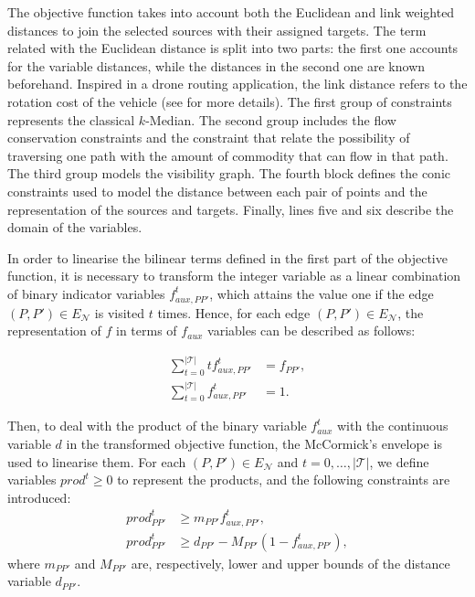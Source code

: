 \documentclass[a4paper,  review, authoryear, 1p.]{elsarticle}
\newcommand{\EN}{{E^{}_{\mathcal N}}}
\newcommand{\CV}[1]{{\color{blue}#1}}
\begin{document}
		\CV{
		The objective function takes into account both the Euclidean and link weighted distances to join the selected sources with their assigned targets. \CV{The term related with the Euclidean distance is split into two parts: the first one accounts for the variable distances, while the distances in the second one are known beforehand. Inspired in a drone routing application, the link distance refers to the rotation cost of the vehicle (see \cite{maheshwari2000} for more details)}. The first group of constraints represents the classical $k$-Median. The second group includes the flow conservation constraints and the constraint that relate the possibility of traversing one path with the amount of commodity that can flow in that path. The third group models the visibility graph. The fourth block defines the conic constraints used to model the distance between each pair of points and the representation of the sources and targets. Finally, lines five and six describe the domain of the variables.
		
		In order to linearise the bilinear terms defined in the first part of the objective function, it is necessary to transform the integer variable as a linear combination of binary indicator variables $f_{aux,PP'}^t$, which attains the value one if the edge $(P,P')\in \EN$ is visited $t$ times. Hence, for each edge $(P,P')\in \EN$, the representation of $f$ in terms of $f_{aux}$ variables can be described as follows:}
		\begin{align*}
			\sum_{t=0}^{|\mathcal T|} t f_{aux,PP'}^t & = f_{PP'},\label{eq:f1}\tag{$f$-representation-C1}\\
			\sum_{t=0}^{|\mathcal T|} f_{aux,PP'}^t & = 1 \label{eq:f2}\tag{$f$-representation-C2}.
		\end{align*}
		
		\CV{
		Then, to deal with the product of the binary variable $f_{aux}^t$ with the continuous variable $d$ in the transformed objective function, the McCormick's envelope is used to linearise them. For each $(P,P')\in \EN$ and $t=0,\ldots,|\mathcal T|$, we define variables $prod^t\geq 0$ to represent the products, and the following constraints are introduced:}
		\begin{align}
			prod_{PP'}^t & \geq m_{PP'} f_{aux,PP'}^t, \label{eq:mccormick1}\tag{McCormick-C1}\\
			prod_{PP'}^t & \geq d_{PP'} - M_{PP'}(1 - f_{aux,PP'}^t) \label{eq:mccormick2}\tag{McCormick-C2},
		\end{align}
		where $m_{PP'}$ and $M_{PP'}$ are, respectively, lower and upper bounds of the distance variable $d_{PP'}$.
		
\end{document}
